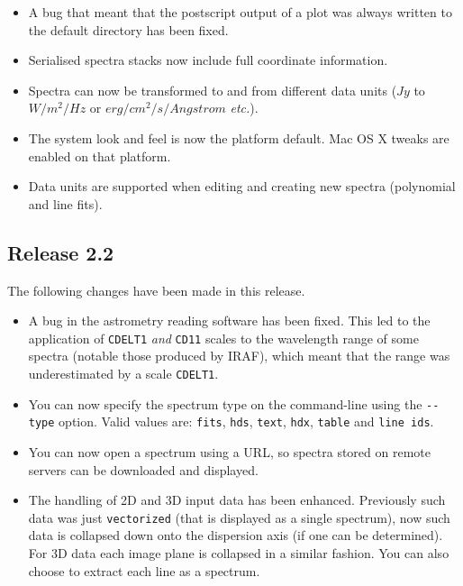 \documentclass[twoside,11pt]{article}
\renewcommand{\_}{\texttt{\symbol{95}}}
\newcommand{\hitext}[1]{\texttt{#1}}
\newcommand{\etc}{\textit{etc.}}
\begin{document}
\begin{itemize}
\item A bug that meant that the postscript output of a plot was always
      written to the default directory has been fixed.

\item Serialised spectra stacks now include full coordinate information.

\item Spectra can now be transformed to and from different data units
      ($Jy$ to $W/m^{2}/Hz$ or $erg/cm^{2}/s/Angstrom$ \etc).

\item The system look and feel is now the platform default. Mac OS X tweaks
      are enabled on that platform.

\item Data units are supported when editing and creating new spectra
     (polynomial and line fits).

\end{itemize}


\subsection{Release 2.2}

 The following changes have been made in this release.
 \begin{itemize}
    \item A bug in the astrometry reading software has been fixed. This led to
      the application of \hitext{CDELT1} \textit{and} \hitext{CD1\_1} scales to the
      wavelength range of some spectra (notable those produced by IRAF), which
      meant that the range was underestimated by a scale \hitext{CDELT1}.

    \item You can now specify the spectrum type on the command-line using the
      \verb|--type| option. Valid values are: \hitext{fits}, \hitext{hds},
      \hitext{text}, \hitext{hdx}, \hitext{table} and \hitext{line ids}.

    \item You can now open a spectrum using a URL, so spectra stored on remote
      servers can be downloaded and displayed.

    \item The handling of 2D and 3D input data has been enhanced. Previously
      such data was just \hitext{vectorized} (that is displayed as a single
      spectrum), now such data is collapsed down onto the dispersion axis (if
      one can be determined). For 3D data each image plane is collapsed in a
      similar fashion. You can also choose to extract each line as a spectrum.
\end{itemize}
\end{document}
